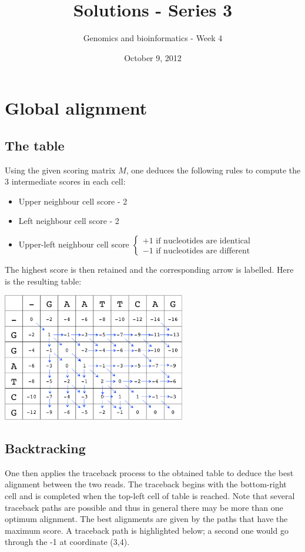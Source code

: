 \documentclass[english, a4paper,11pt]{article}
\title{Solutions - Series 3}
\date{October 9, 2012}
\author{Genomics and bioinformatics - Week 4}
\begin{document}
\maketitle

\section{Global alignment}
\subsection{The table}
\noindent
Using the given scoring matrix $M$, one deduces the following rules to compute the 3 intermediate scores in each cell:
\begin{itemize}
\item Upper neighbour cell score - 2
\item Left neighbour cell score - 2
\item Upper-left neighbour cell score $\left\{\begin{array}{l} +1 \mbox{ if nucleotides are identical} \\ -1 \mbox{ if nucleotides are different}\end{array} \right.$
\end{itemize}
The highest score is then retained and the corresponding arrow is labelled. Here is the resulting table: \\
\begin{center}
\includegraphics[width=0.6\textwidth]{scoring.png}\\
\end{center}

\subsection{Backtracking}
\noindent
One then applies the traceback process to the obtained table to deduce the best alignment between the two reads. 
The traceback begins with the bottom-right cell and is completed when the top-left cell of table is reached. Note that several 
traceback paths are possible and thus in general there may be more than one optimum alignment. The best alignments are given by the paths that have the maximum score. A traceback path is highlighted below; a second one would go through the -1 at coordinate (3,4).
\end{document}
